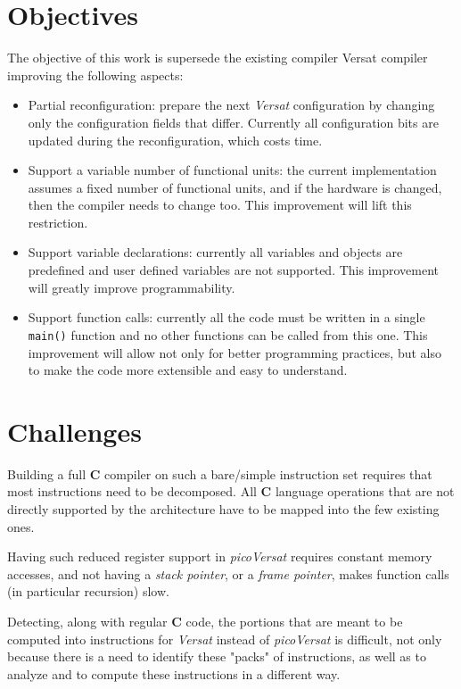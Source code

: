 \section{Objectives}
\label{section:objectivo}

The objective of this work is supersede the existing compiler Versat compiler
improving the following aspects:
\begin{itemize}
\item Partial reconfiguration: prepare the next {\it Versat} configuration by changing
  only the configuration fields that differ. Currently all configuration bits
  are updated during the reconfiguration, which costs time.
\item Support a variable number of functional units: the current implementation
  assumes a fixed number of functional units, and if the hardware is changed, then
  the compiler needs to change too. This improvement will lift this restriction.
\item Support variable declarations: currently all variables and objects are
  predefined and user defined variables are not supported. This improvement
  will greatly improve programmability.
\item Support function calls: currently all the code must be written in a single
  {\tt main()} function and no other functions can be called from this one. This
  improvement will allow not only for better programming practices, but also to
  make the code more extensible and easy to understand.
\end{itemize}

\section{Challenges}
\label{section:desafio}

Building a full {\bf C} compiler on such a bare/simple instruction set requires
that most instructions need to be decomposed.  All {\bf C} language operations
that are not directly supported by the architecture have to be mapped into the
few existing ones.

Having such reduced register support in {\it picoVersat} requires constant
memory accesses, and not having a {\it stack pointer}, or a {\it frame pointer},
makes function calls (in particular recursion) slow.

Detecting, along with regular {\bf C} code, the portions that are meant to be
computed into instructions for {\it Versat} instead of {\it picoVersat} is
difficult, not only because there is a need to identify these "packs" of
instructions, as well as to analyze and to compute these instructions in a
different way.

